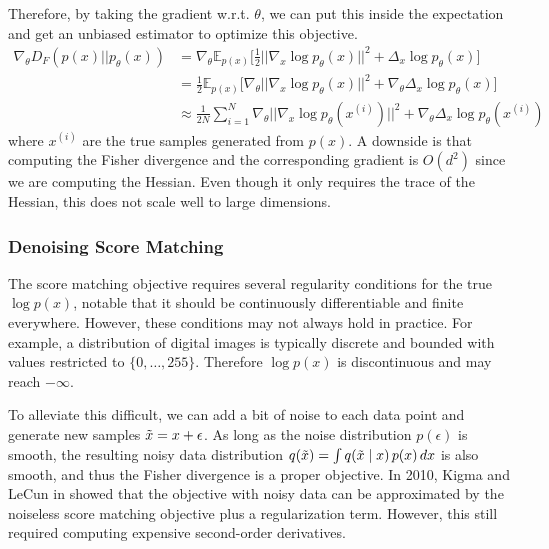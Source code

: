     Therefore, by taking the gradient w.r.t. $\theta$, we can put this inside the expectation and get an unbiased estimator to optimize this objective. 
    \begin{align}
      \nabla_\theta  D_F (p(x) || p_\theta (x)) & = \nabla_\theta \mathbb{E}_{p(x)} \bigg[ \frac{1}{2} || \nabla_x \log p_\theta (x) ||^2 + \Delta_x \log p_\theta (x) \bigg] \\
                                                & = \frac{1}{2} \mathbb{E}_{p(x)} \bigg[ \nabla_\theta || \nabla_x \log p_\theta (x) ||^2 + \nabla_\theta \Delta_x \log p_\theta (x) \bigg] \\ 
                                                & \approx \frac{1}{2N} \sum_{i=1}^N \nabla_\theta || \nabla_x \log p_\theta (x^{(i)}) ||^2 + \nabla_\theta \Delta_x \log p_\theta (x^{(i)}) 
    \end{align}
    where $x^{(i)}$ are the true samples generated from $p(x)$. A downside is that computing the Fisher divergence and the corresponding gradient is $O(d^2)$ since we are computing the Hessian. Even though it only requires the trace of the Hessian, this does not scale well to large dimensions. 

  \subsubsection{Denoising Score Matching} 

    The score matching objective requires several regularity conditions for the true $\log p(x)$, notable that it should be continuously differentiable and finite everywhere. However, these conditions may not always hold in practice. For example, a distribution of digital images is typically discrete and bounded with values restricted to $\{0, \ldots, 255\}$. Therefore $\log p(x)$ is discontinuous and may reach $-\infty$. 

    To alleviate this difficult, we can add a bit of noise to each data point and generate new samples $\Tilde{x} = x + \epsilon$. As long as the noise distribution $p(\epsilon)$ is smooth, the resulting noisy data distribution $q(\Tilde{x}) = \int q(\Tilde{x} \mid x) \, p(x) \,dx$ is also smooth, and thus the Fisher divergence is a proper objective. In 2010, Kigma and LeCun in \cite{reg_score} showed that the objective with noisy data can be approximated by the noiseless score matching objective plus a regularization term. However, this still required computing expensive second-order derivatives. 

